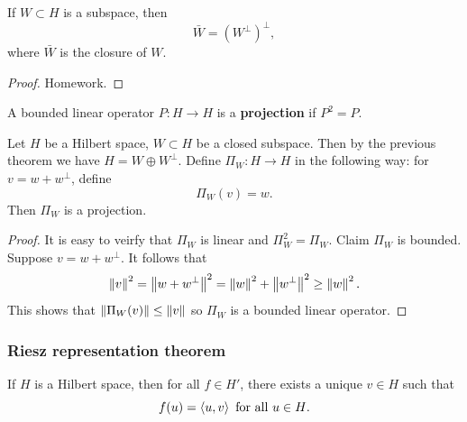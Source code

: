 \documentclass[a4paper]{article}
\begin{document}
\begin{thm}
If $W \subset H$ is a subspace, then 
\[
\bar{W} = \left( W^\perp \right)^\perp,
\]
where $\bar{W}$ is the closure of $W$.
\end{thm}

\begin{proof}
Homework.
\end{proof}

\begin{defi}[Projection]
A bounded linear operator $P : H \to H$ is a \textbf{projection} 
if $P^2 = P$.
\end{defi}

\begin{thm}
Let $H$ be a Hilbert space, $W \subset H$ be a closed 
subspace. Then by the previous theorem we have $H = W 
\oplus W^\perp$. Define $\Pi_W : H \to H$ in the following 
way: for $v = w + w^\perp$, define 
\[
\Pi_W (v) = w.
\]
Then $\Pi_W$ is a projection.
\end{thm}

\begin{proof}
It is easy to veirfy that $\Pi_W$ is linear
and $\Pi_W^2 = \Pi_W$.
Claim $\Pi_W$ is bounded. Suppose $v = w + w^\perp$. 
It follows that
\[
\left\lVert v\right\rVert^2 = \left\lVert w + w^\perp\right\rVert^2 
= \left\lVert w\right\rVert^2 + \left\lVert w^\perp\right\rVert^2 \geq \left\lVert w\right\rVert^2.
\] 
This shows that $\left\lVert \Pi_W(v)\right\rVert \leq \left\lVert v\right\rVert$ 
so $\Pi_W$ is a bounded linear operator.  
\end{proof}

\subsubsection*{Riesz representation theorem}

\begin{thm}
If $H$ is a Hilbert space, then for all $f \in H'$, 
there exists a unique $v \in H$ such that 
\[
f(u) = \left\langle u, v \right\rangle \text{ for all $u \in H$}.
\]
\end{thm}
\end{document}
